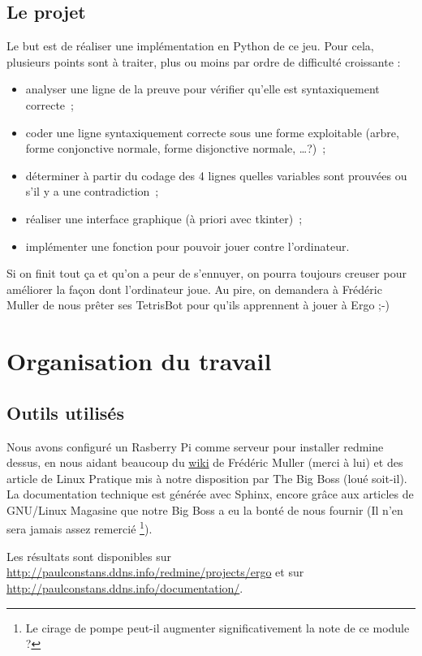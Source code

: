 \documentclass[12pt, algo]{cours}
\begin{document}
\subsection{Le projet}

Le but est de réaliser une implémentation en Python de ce jeu. Pour cela, plusieurs points sont à traiter, plus ou moins par ordre de difficulté croissante :
\begin{itemize}
\item analyser une ligne de la preuve pour vérifier qu'elle est syntaxiquement correcte~;
\item coder une ligne syntaxiquement correcte sous une forme exploitable (arbre, forme conjonctive normale, forme disjonctive normale, \dots ?)~;
\item déterminer à partir du codage des 4 lignes quelles variables sont prouvées ou s'il y a une contradiction~;
\item réaliser une interface graphique (à priori avec tkinter)~;
\item implémenter une fonction pour pouvoir jouer contre l'ordinateur.
\end{itemize}

Si on finit tout ça et qu'on a peur de s'ennuyer, on pourra toujours creuser pour améliorer la façon dont l'ordinateur joue. Au pire, on demandera à Frédéric Muller de nous prêter ses TetrisBot pour qu'ils apprennent à jouer à Ergo ;-)


\section{Organisation du travail}

\subsection{Outils utilisés}

Nous avons configuré un Rasberry Pi comme serveur pour installer redmine dessus, en nous aidant beaucoup du \href{http://juramaths.fr/redmine/projects/serveur-web-sur-un-raspberry-pi/wiki}{wiki} de Frédéric Muller (merci à lui) et des article de Linux Pratique mis à notre disposition par The Big Boss (loué soit-il). La documentation technique est générée avec Sphinx, encore grâce aux articles de GNU/Linux Magasine que notre Big Boss a eu la bonté de nous fournir (Il n'en sera jamais assez remercié \footnote{Le cirage de pompe peut-il augmenter significativement la note de ce module ?}).

Les résultats sont disponibles sur \url{http://paulconstans.ddns.info/redmine/projects/ergo} et sur \url{http://paulconstans.ddns.info/documentation/}.
\end{document}
